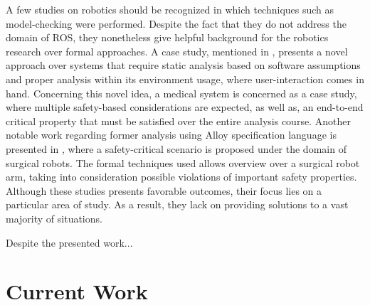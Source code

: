 A few studies on robotics should be recognized in which techniques such as model-checking were performed. Despite the fact that they do not address the domain of ROS, they nonetheless give helpful background for the robotics research over formal approaches. A case study, mentioned in , presents a novel approach over systems that require static analysis based on software assumptions and proper analysis within its environment usage, where user-interaction comes in hand. Concerning this novel idea, a medical system is concerned as a case study, where multiple safety-based considerations are expected, as well as, an end-to-end critical property that must be satisfied over the entire analysis course. Another notable work regarding former analysis using Alloy specification language is presented in , where a safety-critical scenario is proposed under the domain of surgical robots. The formal techniques used allows overview over a surgical robot arm, taking into consideration possible violations of important safety properties. Although these studies presents favorable outcomes, their focus lies on a particular area of study. As a result, they lack on providing solutions to a vast majority of situations.

Despite the presented work... 

\section{Current Work}\label{c:currWork}